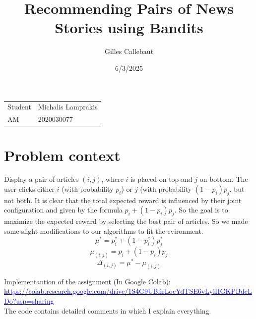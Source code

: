 \documentclass{article}
\title{  Recommending Pairs of News Stories using Bandits 
}
\author{Gilles Callebaut}
\date{6/3/2025}
\begin{document}
\maketitle

\noindent\begin{tabular}{@{}ll}
     Student &  Michalis Lamprakis\\
     AM & 2020030077
\end{tabular}

\section*{Problem context}
Display a pair of articles $(i,j)$, 
where $i$ is placed on top and $j$ on bottom. 
The user clicks either $i$ (with probability $p_i$) or $j$
(with probability $(1-p_i)p_j$, but not both.
It is clear that the total expected reward is influenced by their joint configuration 
and given by the formula $p_i + (1-p_i)p_j$. So the goal is to
maximize the expected reward by selecting the best pair of articles.
So we made some slight modifications to our algorithms to fit the evironment.
\[
    \mu^*= p_i^* + (1-p_i^*)p_j^*
\]
\[
    \mu_{(i,j)} = p_i + (1-p_i)p_j 
\]
\[
    \Delta_{(i,j)} = \mu^* - \mu_{(i,j)}
\]

\noindent Implementantion of the assignment (In Google Colab): \\
\href{https://colab.research.google.com/drive/1S4G9UBfirLocYdTSE6vLyiHGKPBdcLDo?usp=sharing}{\textcolor{blue}{https://colab.research.google.com/drive/1S4G9UBfirLocYdTSE6vLyiHGKPBdcLDo?usp=sharing}}\\
The code contains detailed comments in which I explain everything.
\end{document}
